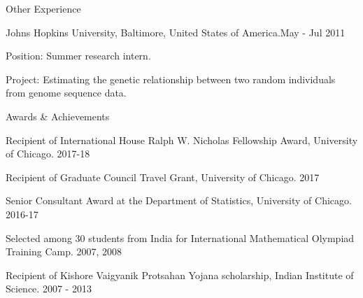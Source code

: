 \documentclass{resume} %
\begin{document}
\begin{rSection}{Other Experience}
\begin{rSubsection}{Johns Hopkins University, Baltimore, United States of America.}{{May - Jul 2011}}{}{}  
\item {Position}: Summer research intern. 
\item {Project}: Estimating the genetic relationship between two random individuals from genome sequence data.
\end{rSubsection}

\end{rSection}




\begin{rSection}{Awards \& Achievements}
\begin{rSubsection}{}{}{}{}
\item Recipient of International House Ralph W. Nicholas Fellowship Award, University of Chicago. \hfill {2017-18}
\item Recipient of Graduate Council Travel Grant, University of Chicago. \hfill {2017}
\item Senior Consultant Award at the Department of Statistics, University of Chicago. \hfill {2016-17}
\item Selected among 30 students from India for International Mathematical Olympiad Training Camp. \hfill {2007, 2008}
\item Recipient of Kishore Vaigyanik Protsahan Yojana scholarship, Indian Institute of Science. \hfill {2007 - 2013}
\end{rSubsection}
\end{rSection}
\end{document}
